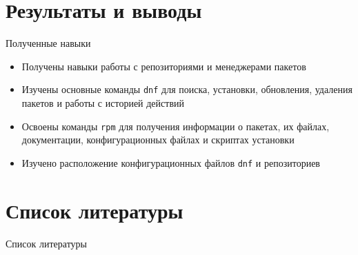 \documentclass[
  ignorenonframetext,
  aspectratio=169,
  russian,
]{beamer}
\providecommand{\tightlist}{%
  \setlength{\itemsep}{0pt}\setlength{\parskip}{0pt}}
\begin{document}
\section{Результаты и
выводы}\label{ux440ux435ux437ux443ux43bux44cux442ux430ux442ux44b-ux438-ux432ux44bux432ux43eux434ux44b}

\begin{frame}[fragile]{Полученные навыки}
\protect{}\label{ux43fux43eux43bux443ux447ux435ux43dux43dux44bux435-ux43dux430ux432ux44bux43aux438}
\begin{itemize}[<+->]
\tightlist
\item
  Получены навыки работы с репозиториями и менеджерами пакетов
\item
  Изучены основные команды \texttt{dnf} для поиска, установки,
  обновления, удаления пакетов и работы с историей действий
\item
  Освоены команды \texttt{rpm} для получения информации о пакетах, их
  файлах, документации, конфигурационных файлах и скриптах установки
\item
  Изучено расположение конфигурационных файлов \texttt{dnf} и
  репозиториев
\end{itemize}
\end{frame}

\section*{Список
литературы}\label{ux441ux43fux438ux441ux43eux43a-ux43bux438ux442ux435ux440ux430ux442ux443ux440ux44b}

\begin{frame}{Список литературы}
\protect{}\label{refs}
\end{frame}
\end{document}
